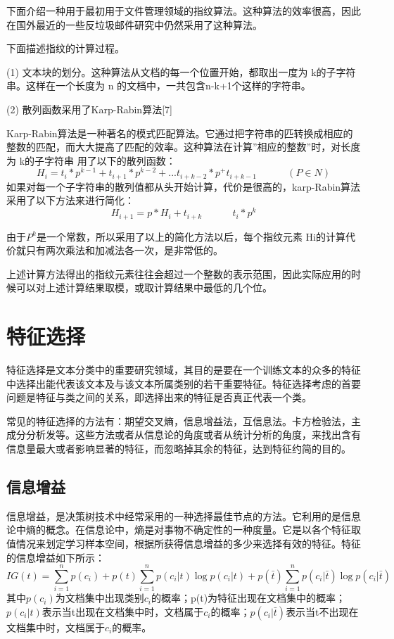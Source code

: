 下面介绍一种用于最初用于文件管理领域的指纹算法。这种算法的效率很高，因此在国外最近的一些反垃圾邮件研究中仍然采用了这种算法。

下面描述指纹的计算过程。

 (1) 文本块的划分。这种算法从文档的每一个位置开始，都取出一度为 k的子字符串。这样在一个长度为 n 的文档中，一共包含n-k+1个这样的字符串。
 
(2) 散列函数采用了Karp-Rabin算法[7]

  Karp-Rabin算法是一种著名的模式匹配算法。它通过把字符串的匹转换成相应的整数的匹配，而大大提高了匹配的效率。这种算法在计算”相应的整数”时，对长度为 k的子字符串 用了以下的散列函数：
\begin{equation}
 H_i=t_i*p^{k-1}+t_{i+1}*p^{k-2}+...t_{i+k-2}*p^+t_{i+k-1} ~~~~~~~~~~~~~~(P\in N)
\end{equation}
如果对每一个子字符串的散列值都从头开始计算，代价是很高的，karp-Rabin算法采用了以下方法来进行简化：
\begin{equation}
 H_{i+1}=p*H_i+t_{i+k} ~~~~~~~~~~~~~~t_i*p^k
\end{equation}

由于$P^k$是一个常数，所以采用了以上的简化方法以后，每个指纹元素 Hi的计算代价就只有两次乘法和加减法各一次，是非常低的。

 上述计算方法得出的指纹元素往往会超过一个整数的表示范围，因此实际应用的时候可以对上述计算结果取模，或取计算结果中最低的几个位。
\section{特征选择}
特征选择是文本分类中的重要研究领域，其目的是要在一个训练文本的众多的特征中选择出能代表该文本及与该文本所属类别的若干重要特征。特征选择考虑的首要问题是特征与类之间的关系，即选择出来的特征是否真正代表一个类。

  常见的特征选择的方法有：期望交叉熵，信息增益法，互信息法。卡方检验法，主成分分析发等。这些方法或者从信息论的角度或者从统计分析的角度，来找出含有信息量最大或者影响显著的特征，而忽略掉其余的特征，达到特征约简的目的。
\subsection{信息增益}
信息增益，是决策树技术中经常采用的一种选择最佳节点的方法。它利用的是信息论中熵的概念。在信息论中，熵是对事物不确定性的一种度量。它是以各个特征取值情况来划定学习样本空间，根据所获得信息增益的多少来选择有效的特征。特征的信息增益如下所示：
\begin{equation}
 IG(t)=\sum_{i=1}^{n}p(c_i)+p(t)\sum_{i=1}^{n}p(c_i|t)\log p(c_i|t)+p(\bar{t})\sum_{i=1}^{n}p(c_i|\bar{t})\log p(c_i|\bar{t})
\end{equation}
其中$p(c_i)$为文档集中出现类别$c_i$的概率；p(t)为特征出现在文档集中的概率；$p(c_i|t)$表示当t出现在文档集中时，文档属于$c_i$的概率；$p(c_i|\bar{t})$表示当t不出现在文档集中时，文档属于$c_i$的概率。

